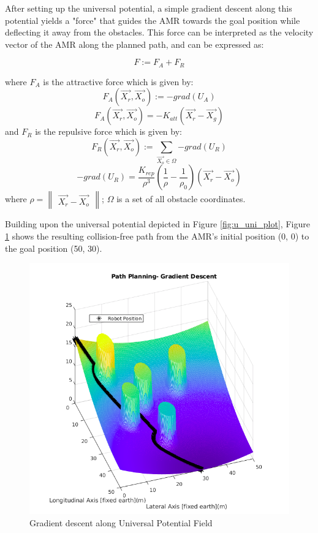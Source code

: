 \documentclass[a4paper, twocolumn]{article}
\begin{document}
After setting up the universal potential, a simple gradient descent along this potential yields a "force" that guides the AMR towards the goal position 
while deflecting it away from the obstacles. This force can be interpreted as the velocity vector of the AMR along the planned path, 
and can be expressed as: 

$$F:= F_{A} + F_{R}$$

\noindent
where $F_{A}$ is the attractive force which is given by:
$$F_{A}(\vec{X_{r}}, \vec{X_{o}}):= -grad(U_{A})$$
$$F_{A}(\vec{X_{r}}, \vec{X_{o}})= -K_{att} \left(\vec{X_{r}} - \vec{X_{g}}\right)$$
\noindent
and $F_{R}$ is the repulsive force which is given by:
$$F_{R}(\vec{X_{r}}, \vec{X_{o}}):= \sum_{ \vec{X_{o}} \in \Omega}{-grad(U_{R})} $$
$$-grad(U_{R})= \frac{K_{rep}}{\rho^{3}} 
        \left( \frac{1}{\rho} - \frac{1}{\rho_{0}} \right) 
        \left(\vec{X_{r}} - \vec{X_{o}}\right) $$
\noindent
where 
$\rho= \begin{Vmatrix}\vec{X_{r}} - \vec{X_{o}}\end{Vmatrix}$;
$\Omega$ is a set of all obstacle coordinates.
 
Building upon the universal potential depicted in Figure \ref{fig:u_uni_plot}, Figure \ref{fig:path} shows the resulting collision-free path from the AMR's initial position (0, 0) to the goal position (50, 30).

\begin{figure}
    \centering
    \includegraphics[scale=1.2]{presentation/img/path.png}
    \caption{Gradient descent along Universal Potential Field}
    \label{fig:path}
\end{figure}
\end{document}
